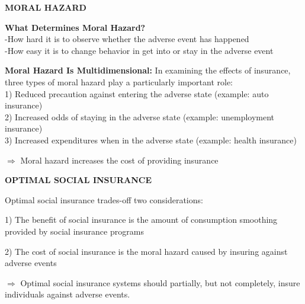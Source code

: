 \documentclass[landscape]{slides}
\begin{document}
\begin{slide}
\begin{center}
{\bf MORAL HAZARD}
\end{center}

{\bf What Determines Moral Hazard?}\\
-How hard it is to observe whether the adverse event has happened \\
-How easy it is to change behavior in get into or stay in the adverse event

{\bf Moral Hazard Is Multidimensional:}
In examining the effects of insurance, three types of moral hazard play a particularly important role:\\
1) Reduced precaution against entering the adverse state (example: auto insurance) \\
2) Increased odds of staying in the adverse state (example: unemployment insurance)\\
3) Increased expenditures when in the adverse state (example: health insurance)

$\Rightarrow$ Moral hazard increases the cost of providing insurance
\end{slide}

%
%
%
%


\begin{slide}
\begin{center}
{\bf  OPTIMAL SOCIAL INSURANCE}
\end{center}
Optimal social insurance trades-off two considerations:

1) The benefit of social insurance is the amount of consumption smoothing provided by social insurance programs

2) The cost of social insurance is the moral hazard caused by insuring against adverse events

$\Rightarrow$ Optimal social insurance systems should partially, but not completely, insure individuals against adverse events.

\end{slide}
\end{document}
